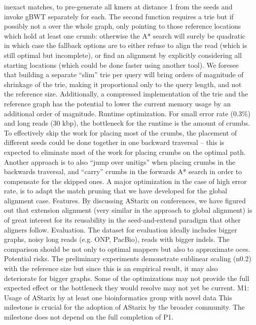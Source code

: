 inexact matches, to pre-generate all kmers at distance 1 from the seeds and
invoke gBWT separately for each. The second function requires a trie but if
possibly not a over the whole graph, only pointing to those reference locations
which hold at least one crumb: otherwise the A* search will surely be quadratic
in which case the fallback options are to either refuse to align the read (which
is still optimal but incomplete), or find an alignment by explicitly considering
all starting locations (which could be done faster using another tool). We
foresee that building a separate “slim” trie per query will bring orders of
magnitude of shrinkage of the trie, making it proportional only to the query
length, and not the reference size. Additionally, a compressed implementation of
the trie and the reference graph has the potential to lower the current memory
usage by an additional order of magnitude. Runtime optimization. For small error
rate (0.3\%) and long reads (30 kbp), the bottleneck for the runtime is the
amount of crumbs. To effectively skip the work for placing most of the crumbs,
the placement of different seeds could be done together in one backward
traversal – this is expected to eliminate most of the work for placing crumbs on
the optimal path.  Another approach is to also “jump over unitigs” when placing
crumbs in the backwards traversal, and “carry” crumbs in the forwards A* search
in order to compensate for the skipped ones. A major optimization in the case of
high error rate, is to adapt the match pruning that we have developed for the
global alignment case. Features. By discussing AStarix on conferences, we have
figured out that extension alignment (very similar in the approach to global
alignment) is of great interest for its reusability in the seed-and-extend
paradigm that other aligners follow. Evaluation. The dataset for evaluation
ideally includes bigger graphs, noisy long reads (e.g. ONP, PacBio), reads with
bigger indels. The comparison should be not only to optimal mappers but also to
approximate oces. Potential risks. The preliminary experiments demonstrate
sublinear scaling (n0.2) with the reference size but since this is an empirical
result, it may also deteriorate for bigger graphs. Some of the optimizations may
not provide the full expected effect or the bottleneck they would resolve may
not yet be current. M1: Usage of AStarix by at least one bioinformatics group
with novel data This milestone is crucial for the adoption of AStarix by the
broader community. The milestone does not depend on the full completion of P1.

